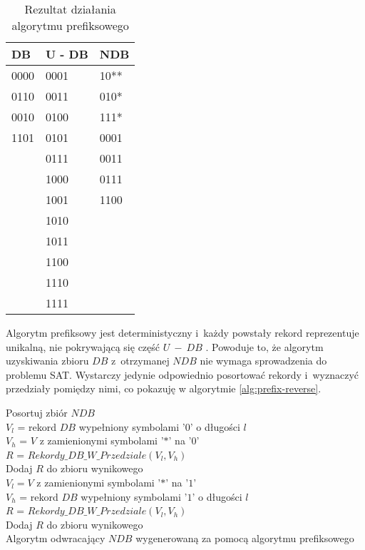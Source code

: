 \begin{table}[h]
    \centering
    \begin{tabular}{|l|l|l|}
        \hline
        DB   & U - DB & NDB  \\ \hline
        0000 & 0001   & 10** \\
        0110 & 0011   & 010* \\
        0010 & 0100   & 111* \\
        1101 & 0101   & 0001 \\
        & 0111   & 0011 \\
        & 1000   & 0111 \\
        & 1001   & 1100 \\
        & 1010   &      \\
        & 1011   &      \\
        & 1100   &      \\
        & 1110   &      \\
        & 1111   &      \\ \hline
    \end{tabular}
    \caption{Rezultat działania algorytmu prefiksowego}
    \label{tbl:prefix_results}
\end{table}



Algorytm prefiksowy jest deterministyczny i~każdy powstały rekord reprezentuje unikalną, nie pokrywającą się część $U~-~DB$ \cite{NRI-Esponda}.
Powoduje to, że algorytm uzyskiwania zbioru $DB$ z~otrzymanej $NDB$ nie wymaga sprowadzenia do problemu SAT. Wystarczy jedynie odpowiednio posortować rekordy i~wyznaczyć przedziały pomiędzy nimi, co pokazuję w algorytmie \ref{alg:prefix-reverse}.

\begin{algorithm}[H]
    \SetAlgoLined
    Posortuj zbiór $NDB$\\
    $V_l$ = rekord $DB$ wypełniony symbolami '$0$' o długości $l$\\
    {
        $V_h$ = $V$ z zamienionymi symbolami '$*$' na '$0$'\\
        $R$ = $Rekordy\_DB\_W\_Przedziale(V_l, V_h)$\\
        Dodaj $R$ do zbioru wynikowego \\
        $V_l = V$ z zamienionymi symbolami '$*$' na '$1$'\\
    }
    $V_h$ = rekord $DB$ wypełniony symbolami '$1$' o długości $l$\\
    $R$ = $Rekordy\_DB\_W\_Przedziale(V_l, V_h)$\\
    Dodaj $R$ do zbioru wynikowego \\
    \caption{Algorytm odwracający $NDB$ wygenerowaną za pomocą algorytmu prefiksowego}
    \label{alg:prefix-reverse}
\end{algorithm}

